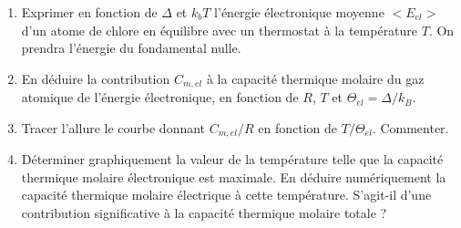 \begin{enumerate}
\begin{enumerate}
		\item Exprimer en fonction de $\Delta$ et $k_bT$ l'énergie électronique moyenne $<E_{el}>$ d'un atome de chlore en équilibre avec un thermostat à la température $T$. On prendra l'énergie du fondamental nulle.
		
		\item En déduire la contribution $C_{m, el}$ à la capacité thermique molaire du gaz atomique  de l'énergie électronique, en fonction de $R$, $T$ et $\Theta_{el} = \Delta / k_B$. 
		
		\item Tracer l'allure le courbe donnant $C_{m, el}/R$ en fonction de $T/\Theta_{el}$. Commenter.
		
		\item Déterminer graphiquement la valeur de la température telle que la capacité thermique molaire électronique est maximale. En déduire numériquement la capacité thermique molaire électrique à cette température. S'agit-il d'une contribution significative à la capacité thermique molaire totale ?
	\end{enumerate}
	
\end{enumerate}

